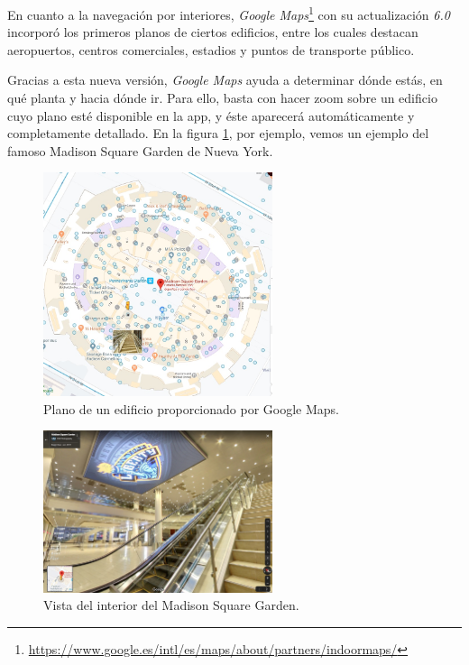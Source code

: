 \documentclass{article}
\begin{document}
		En cuanto a la navegación por interiores, \textit{Google Maps}\footnote{\url{https://www.google.es/intl/es/maps/about/partners/indoormaps/}} con su actualización \textit{6.0} incorporó los primeros planos de ciertos edificios, entre los cuales destacan aeropuertos, centros comerciales, estadios y puntos de transporte público.
		
		Gracias a esta nueva versión, \textit{Google Maps} ayuda a determinar dónde estás, en qué planta y hacia dónde ir. Para ello, basta con hacer zoom sobre un edificio cuyo plano esté disponible en la app, y éste aparecerá automáticamente y completamente detallado. En la figura \ref{fig:ejemplo}, por ejemplo, vemos un ejemplo del famoso Madison Square Garden de Nueva York. 
		
		 \begin{figure}[t]
			\centering
			\includegraphics[width=0.6\textwidth]{MadSq2}
			\caption{Plano de un edificio proporcionado por Google Maps.}
			\label{fig:ejemplo}
		\end{figure}
		
		 \begin{figure}[t]
			\centering
			\includegraphics[width=0.6\textwidth]{MadSq3}
			\caption{Vista del interior del Madison Square Garden. }
			\label{fig:ejemplo2}
		\end{figure}
	    
\end{document}
